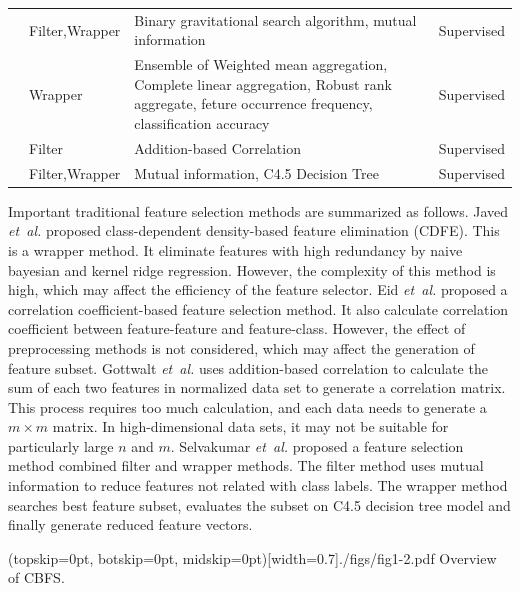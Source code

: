 \documentclass{ieeeaccess}
\theoremstyle{definition}
\begin{document}
\begin{table}[!htbp]
\begin{tabular}{p{3em}p{8em}p{20em}p{11em}}
        \cite{Bostani2017} & Filter,\newline{}Wrapper & Binary gravitational search algorithm, mutual information & Supervised \\
        \cite{Brahim2018} & Wrapper & Ensemble of Weighted mean aggregation, Complete linear aggregation, Robust rank aggregate, feture occurrence frequency, classification accuracy & Supervised \\
        \cite{CorrCorr2019} & Filter & Addition-based Correlation & Supervised \\
        \cite{Selvakumar2019} & Filter,\newline{}Wrapper & Mutual information, C4.5 Decision Tree & Supervised \\
        \bottomrule
        \end{tabular}%
    \label{tab:related-works}%
\end{table}%

Important traditional feature selection methods are summarized as follows. 
Javed \emph{et~al.} \cite{Javed2012} proposed class-dependent density-based feature elimination (CDFE). This is a wrapper method. It eliminate features with high redundancy by naive bayesian and kernel ridge regression. However, the complexity of this method is high, which may affect the efficiency of the feature selector.
Eid \emph{et~al.} \cite{Eid2013} proposed a correlation coefficient-based feature selection method. It also calculate correlation coefficient between feature-feature and feature-class. However, the effect of preprocessing methods is not considered, which may affect the generation of feature subset. 
Gottwalt \emph{et~al.} \cite{CorrCorr2019} uses addition-based correlation to calculate the sum of each two features in normalized data set to generate a correlation matrix. This process requires too much calculation, and each data needs to generate a $m \times m$ matrix. In high-dimensional data sets, it may not be suitable for particularly large $n$ and $m$.
Selvakumar \emph{et~al.} \cite{Selvakumar2019} proposed a feature selection method combined filter and wrapper methods. The filter method uses mutual information to reduce features not related with class labels. The wrapper method searches best feature subset, evaluates the subset on C4.5 decision tree model and finally generate reduced feature vectors. 

\Figure[!htpb](topskip=0pt, botskip=0pt, midskip=0pt)[width=0.7\textwidth]{./figs/fig1-2.pdf}
{Overview of CBFS. \label{fig:overview}}
\end{document}

